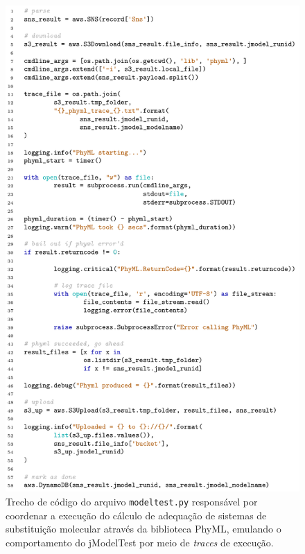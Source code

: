 \documentclass[english,brazilian]{UNISINOSmonografia} %
\begin{document}
\begin{figure}[tp]
	\centering%
	\begin{minipage}{\textwidth}
		\caption{Trecho de código do arquivo \texttt{modeltest.py} responsável por coordenar a execução do cálculo de adequação de sistemas de substituição molecular através da biblioteca PhyML, emulando o comportamento do jModelTest por meio de \textit{traces} de execução.}
		\label{fig:metodologia-prototipo-src}
		\vspace{1ex}
		\includegraphics[height=.87\textheight]{metodologia-prototipo-src}
	\end{minipage}
\end{figure}
\end{document}
